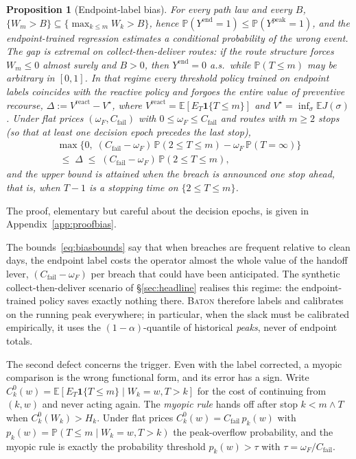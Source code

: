 \documentclass[preprint,authoryear,12pt]{elsarticle}
\newtheorem{proposition}[theorem]{Proposition}
\theoremstyle{definition}
\theoremstyle{remark}
\begin{document}
\begin{proposition}[Endpoint-label bias]\label{prop:bias}
For every path law and every $B$,
$\{W_m > B\} \subseteq \{\max_{k\le m} W_k > B\}$, hence
$\mathbb P(Y^{\mathrm{end}}{=}1) \le \mathbb P(Y^{\mathrm{peak}}{=}1)$,
and the endpoint-trained regression estimates a conditional probability
of the wrong event. The gap is extremal on collect-then-deliver routes:
if the route structure forces $W_m \le 0$ almost surely and $B > 0$,
then $Y^{\mathrm{end}} = 0$ a.s.\ while $\mathbb P(T \le m)$ may be
arbitrary in $[0,1]$. In that regime every threshold policy trained on
endpoint labels coincides with the reactive policy and forgoes the
entire value of preventive recourse,
$\Delta := V^{\mathrm{react}} - V^\star$, where
$V^{\mathrm{react}} = \mathbb E[E_T \mathbf 1\{T \le m\}]$ and
$V^\star = \inf_\sigma \mathbb E J(\sigma)$. Under flat prices
$(\omega_F, C_{\mathrm{fail}})$ with $0 \le \omega_F \le C_{\mathrm{fail}}$
and routes with $m \ge 2$ stops (so that at least one decision epoch
precedes the last stop),
\begin{multline}\label{eq:biasbounds}
  \max\bigl\{0,\;
  (C_{\mathrm{fail}} - \omega_F)\,\mathbb P(2 \le T \le m)
  - \omega_F\,\mathbb P(T = \infty)\bigr\} \\
  \;\le\; \Delta \;\le\;
  (C_{\mathrm{fail}} - \omega_F)\,\mathbb P(2 \le T \le m),
\end{multline}
and the upper bound is attained when the breach is announced one stop
ahead, that is, when $T-1$ is a stopping time on $\{2 \le T \le m\}$.
\end{proposition}

The proof, elementary but careful about the decision epochs, is given in
Appendix~\ref{app:proofbias}.

The bounds~\eqref{eq:biasbounds} say that when breaches are frequent
relative to clean days, the endpoint label costs the operator almost the
whole value of the handoff lever, $(C_{\mathrm{fail}} - \omega_F)$ per
breach that could have been anticipated. The synthetic
collect-then-deliver scenario of \S\ref{sec:headline} realises this
regime: the endpoint-trained policy saves exactly nothing there.
\textsc{Baton} therefore labels and calibrates on the running peak
everywhere; in particular, when the slack must be calibrated
empirically, it uses the $(1{-}\alpha)$-quantile of historical
\emph{peaks}, never of endpoint totals.

The second defect concerns the trigger. Even with the label corrected,
a myopic comparison is the wrong functional form, and its error has a
sign. Write
$C^0_k(w) = \mathbb E[E_T \mathbf 1\{T \le m\} \mid W_k = w, T > k]$
for the cost of continuing from $(k,w)$ and never acting again. The
\emph{myopic rule} hands off after stop $k < m \wedge T$ when
$C^0_k(W_k) > H_k$.
Under flat prices $C^0_k(w) = C_{\mathrm{fail}}\,p_k(w)$ with
$p_k(w) = \mathbb P(T \le m \mid W_k = w, T > k)$ the peak-overflow
probability, and the myopic rule is exactly the probability threshold
$p_k(w) > \tau$ with $\tau = \omega_F / C_{\mathrm{fail}}$.
\end{document}
